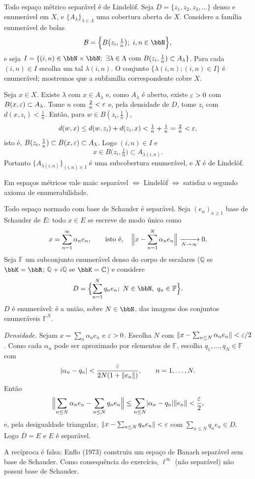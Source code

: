 \begin{exercicio}{Todo espaço métrico separável é de Lindelöf.}
\sol
Seja $D=\{z_1,z_2,z_3,\dots\}$ denso e enumerável em $X$, e $\{A_\lambda\}_{\lambda\in\Lambda}$ uma cobertura aberta de $X$. Considere a família enumerável de bolas
\[ \mathcal{B}=\Bigl\{B\bigl(z_i,\tfrac1n\bigr);\ i,n\in\N \Bigr\}, \]
e seja $I=\{(i,n)\in\N\times\N;\ \exists\lambda\in\Lambda \text{ com } B(z_i,\tfrac1n)\subset A_\lambda\}$. Para cada $(i,n)\in I$ escolha um tal $\lambda(i,n)$. O conjunto $\{\lambda(i,n);(i,n)\in I\}$ é enumerável; mostremos que a subfamília correspondente cobre $X$.

Seja $x\in X$. Existe $\lambda$ com $x\in A_\lambda$ e, como $A_\lambda$ é aberto, existe $\varepsilon>0$ com $B(x,\varepsilon)\subset A_\lambda$. Tome $n$ com $\frac2n<\varepsilon$ e, pela densidade de $D$, tome $z_i$ com $d(x,z_i)<\frac1n$. Então, para $w\in B(z_i,\frac1n)$,
\[ d(w,x)\le d(w,z_i)+d(z_i,x)<\tfrac1n+\tfrac1n=\tfrac2n<\varepsilon, \]
isto é, $B(z_i,\frac1n)\subset B(x,\varepsilon)\subset A_\lambda$. Logo $(i,n)\in I$ e
\[ x\in B\bigl(z_i,\tfrac1n\bigr)\subset A_{\lambda(i,n)}. \]
Portanto $\{A_{\lambda(i,n)}\}_{(i,n)\in I}$ é uma subcobertura enumerável, e $X$ é de Lindelöf.

\begin{obs}
Em espaços métricos vale mais: separável $\iff$ Lindelöf $\iff$ satisfaz o segundo axioma de enumerabilidade.
\end{obs}
\end{exercicio}

\begin{exercicio}{Todo espaço normado com base de Schauder é separável.}
\sol
Seja $(e_n)_{n\ge1}$ base de Schauder de $E$: todo $x\in E$ se escreve de modo único como
\[ x=\sum_{n=1}^{\infty}\alpha_ne_n,\qquad \text{isto é},\quad \Bigl\|x-\sum_{n=1}^{N}\alpha_ne_n\Bigr\|\xrightarrow[N\to\infty]{}0. \]
Seja $\mathbb{F}$ um subconjunto enumerável denso do corpo de escalares ($\mathbb{Q}$ se $\bbK=\R$; $\mathbb{Q}+i\mathbb{Q}$ se $\bbK=\mathbb{C}$) e considere
\[ D=\Bigl\{\sum_{n=1}^{N}q_ne_n;\ N\in\N,\ q_n\in\mathbb{F}\Bigr\}. \]
$D$ é enumerável: é a união, sobre $N\in\N$, das imagens dos conjuntos enumeráveis $\mathbb{F}^N$.

\emph{Densidade.} Sejam $x=\sum_n\alpha_ne_n$ e $\varepsilon>0$. Escolha $N$ com $\lVert x-\sum_{n\le N}\alpha_ne_n\rVert<\varepsilon/2$. Como cada $\alpha_n$ pode ser aproximado por elementos de $\mathbb{F}$, escolha $q_1,\dots,q_N\in\mathbb{F}$ com
\[ \lvert\alpha_n-q_n\rvert<\frac{\varepsilon}{2N(1+\lVert e_n\rVert)},\qquad n=1,\dots,N. \]
Então
\[ \Bigl\|\sum_{n\le N}\alpha_ne_n-\sum_{n\le N}q_ne_n\Bigr\|\le\sum_{n\le N}\lvert\alpha_n-q_n\rvert\lVert e_n\rVert<\frac{\varepsilon}2, \]
e, pela desigualdade triangular, $\lVert x-\sum_{n\le N}q_ne_n\rVert<\varepsilon$ com $\sum_{n\le N}q_ne_n\in D$. Logo $\overline{D}=E$ e $E$ é separável.

\begin{obs}
A recíproca é falsa: Enflo (1973) construiu um espaço de Banach separável sem base de Schauder. Como consequência do exercício, $\ell^\infty$ (não separável) não possui base de Schauder.
\end{obs}
\end{exercicio}

